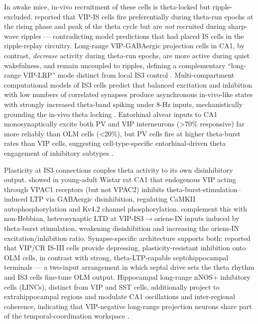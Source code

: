 \documentclass[11pt]{article}
\let\origrightarrow\rightarrow
\def\rightarrow{\ensuremath{\origrightarrow}}
\begin{document}
In awake mice, in-vivo recruitment of these cells is theta-locked but ripple-excluded. \citet{Luo2020} reported that VIP-IS cells fire preferentially during theta-run epochs at the rising phase and peak of the theta cycle but are \textit{not} recruited during sharp-wave ripples --- contradicting model predictions that had placed IS cells in the ripple-replay circuitry. Long-range VIP-GABAergic projection cells in CA1, by contrast, \textit{decrease} activity during theta-run epochs, are more active during quiet wakefulness, and remain uncoupled to ripples, defining a complementary ``long-range VIP-LRP'' mode distinct from local IS3 control \citep{Francavilla2018a}. Multi-compartment computational models of IS3 cells predict that balanced excitation and inhibition with low numbers of correlated synapses produce asynchronous in-vivo-like states with strongly increased theta-band spiking under 8-Hz inputs, mechanistically grounding the in-vivo theta locking \citep{Guetmccreight2019}. Entorhinal alvear inputs to CA1 monosynaptically excite both PV and VIP interneurons (\textgreater 70\% responsive) far more reliably than OLM cells (\textless 20\%), but PV cells fire at higher theta-burst rates than VIP cells, suggesting cell-type-specific entorhinal-driven theta engagement of inhibitory subtypes \citep{Bell2021}.

Plasticity at IS3 connections couples theta activity to its own disinhibitory output. \citet{Caulinorocha2022} showed in young-adult Wistar rat CA1 that endogenous VIP acting through VPAC1 receptors (but not VPAC2) inhibits theta-burst-stimulation--induced LTP via GABAergic disinhibition, regulating CaMKII autophosphorylation and Kv4.2 channel phosphorylation. \citet{Jabonska2026} complement this with non-Hebbian, heterosynaptic LTD at VIP-IS3\rightarrow oriens-IN inputs induced by theta-burst stimulation, weakening disinhibition and increasing the oriens-IN excitation/inhibition ratio. Synapse-specific architecture supports both: \citet{Chamberland2010} reported that VIP/CR IS-III cells provide depressing, plasticity-resistant inhibition onto OLM cells, in contrast with strong, theta-LTP-capable septohippocampal terminals --- a two-input arrangement in which septal drive sets the theta rhythm and IS3 cells fine-tune OLM output. Hippocampal long-range nNOS+ inhibitory cells (LINCs), distinct from VIP and SST cells, additionally project to extrahippocampal regions and modulate CA1 oscillations and inter-regional coherence, indicating that VIP-negative long-range projection neurons share part of the temporal-coordination workspace \citep{Christensonwick2019}.
\end{document}
